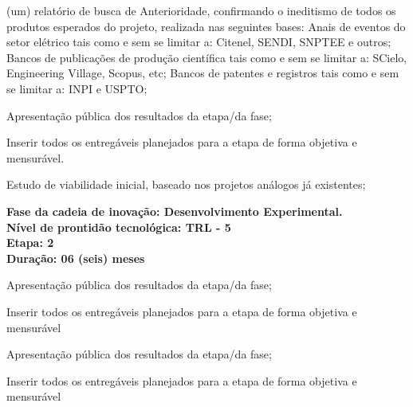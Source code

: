 \xxx \textbf{}

 (um) relatório de busca de Anterioridade, confirmando o ineditismo de todos os produtos esperados do projeto, realizada nas seguintes bases: Anais de eventos do setor elétrico tais como e sem se limitar a: Citenel, SENDI, SNPTEE e outros; Bancos de publicações de produção científica tais como e sem se limitar a: SCielo, Engineering Village, Scopus, etc; Bancos de patentes e registros tais como e sem se limitar a: INPI e USPTO;

\xxxx Apresentação pública dos resultados da etapa/da fase;

\xxxx Inserir todos os entregáveis planejados para a etapa de forma objetiva e mensurável.

\xxxx Estudo de viabilidade inicial, baseado nos projetos análogos já existentes;

\xxx \textbf{Fase da cadeia de inovação: Desenvolvimento Experimental. \\ 
 Nível de prontidão tecnológica: TRL - 5 \\ 
 Etapa: 2\\ 
 Duração: 06 (seis) meses 
}

\xxxx Apresentação pública dos resultados da etapa/da fase;

\xxxx Inserir todos os entregáveis planejados para a etapa de forma objetiva e mensurável

\xxx \textbf{}

\xxxx Apresentação pública dos resultados da etapa/da fase;

\xxxx Inserir todos os entregáveis planejados para a etapa de forma objetiva e mensurável

\xxx \textbf{}

